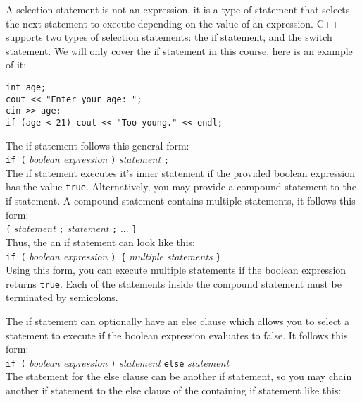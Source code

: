 \documentclass[a4paper,12pt]{article}
\begin{document}
A selection statement is not an expression, it is a type of statement that selects the next statement to execute depending on the value of an expression. C++ supports two types of selection statements: the if statement, and the switch statement. We will only cover the if statement in this course, here is an example of it:

\begin{lstlisting}
int age;
cout << "Enter your age: ";
cin >> age;
if (age < 21) cout << "Too young." << endl;
\end{lstlisting}

The if statement follows this general form: \\

\texttt{if (} \textit{boolean expression} \texttt{)} \textit{statement} \texttt{;} \\

The if statement executes it's inner statement if the provided boolean expression has the value \texttt{true}. Alternatively, you may provide a compound statement to the if statement. A compound statement contains multiple statements, it follows this form: \\

\texttt{\{} \textit{statement} \texttt{;} \textit{statement} \texttt{;} ... \texttt{\}} \\

Thus, the an if statement can look like this: \\

\texttt{if (} \textit{boolean expression} \texttt{) \{} \textit{multiple statements} \texttt{\}} \\

Using this form, you can execute multiple statements if the boolean expression returns \texttt{true}. Each of the statements inside the compound statement must be terminated by semicolons. 

The if statement can optionally have an else clause which allows you to select a statement to execute if the boolean expression evaluates to false. It follows this form: \\

\texttt{if (} \textit{boolean expression} \texttt{)} \textit{statement} \texttt{else} \textit{statement} \\

The statement for the else clause can be another if statement, so you may chain another if statement to the else clause of the containing if statement like this: \\
\end{document}
